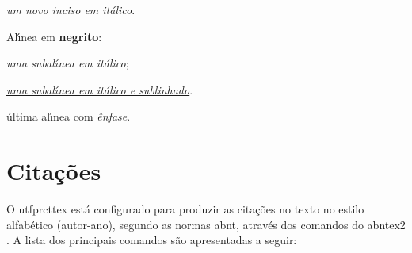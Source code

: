 \begin{alineas}
\begin{incisos}
\item \textit{um novo inciso em it\'alico}.
\end{incisos}
\item Al\'{\i}nea em \textbf{negrito}:
\begin{subalineas}%
\item \textit{uma subal\'{\i}nea em it\'alico};
\item \underline{\textit{uma subal\'{\i}nea em it\'alico e sublinhado}}.
\end{subalineas}
\item \'ultima al\'{\i}nea com \emph{\^enfase}.
\end{alineas}

\section{Cita\c{c}\~oes}\label{sec:citacoes}

O \gls{utfprcttex} est\'a configurado para produzir as cita\c{c}\~oes no texto no estilo alfab\'etico (autor-ano), segundo as normas \gls{abnt}, atrav\'es dos comandos do \gls{abntex2} \cite{abnTeX2:2013Cite,abnTeX2:2013CiteAlf}. A lista dos principais comandos s\~ao apresentadas a seguir:

